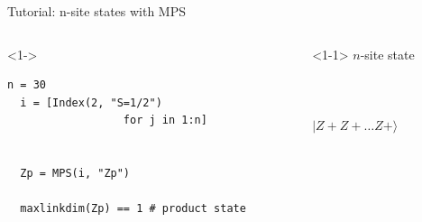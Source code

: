 \begin{frame}[fragile]{Tutorial: n-site states with MPS}

\begin{columns}

\begin{column}{4.5cm}

\begin{onlyenv}<1->
\begin{lstlisting}[language=JuliaLocal, style=julia, mathescape, basicstyle=\scriptsize\ttfamily]
  n = 30
  i = [Index(2, "S=1/2")
                  for j in 1:n]

  
  Zp = MPS(i, "Zp")

  maxlinkdim(Zp) == 1 # product state
\end{lstlisting}
\end{onlyenv}

\end{column}

\begin{column}{5.5cm}

\begin{onlyenv}<1-1>
\vspace*{-0.1cm}
$n$-site state \\
~\\
~\\
~\\
$|Z+Z+\dots Z+\rangle$ \\
~\\
~\\
\end{onlyenv}


\end{column}
\end{columns}
\end{frame}
